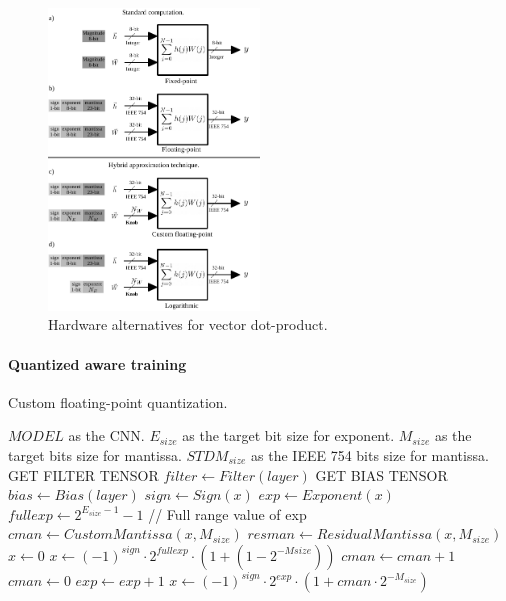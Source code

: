 \begin{figure}[t!]
	\centering
	\includegraphics[width=0.5\textwidth]{../figures/dot-product_unit.pdf}
	\caption{Hardware alternatives for vector dot-product.}
	\label{fig:dot_product}
\end{figure}


\paragraph{\textbf{Quantized aware training}}


\begin{algorithm}[h!]
	\label{alg:quantize_training}
	\caption{Custom floating-point quantization.}
	\begin{algorithmic}
		\SetAlgoLined
		\renewcommand{\algorithmicrequire}{\textbf{input:}}
		\renewcommand{\algorithmicensure}{\textbf{output:}}
		\REQUIRE $MODEL$ as the CNN.
		\REQUIRE $E_{size}$ as the target bit size for exponent.
		\REQUIRE $M_{size}$ as the target bits size for mantissa.
		\REQUIRE $STDM_{size}$ as the IEEE 754 bits size for mantissa.
		\STATE GET FILTER TENSOR $filter \gets Filter(layer)$
		\STATE GET BIAS TENSOR $bias \gets Bias(layer)$
			\STATE $sign \gets Sign(x)$
			\STATE $exp \gets Exponent(x)$
			\STATE $fullexp \gets 2^{E_{size}-1}-1$ // Full range value of exp
			\STATE $cman \gets CustomMantissa(x, M_{size})$
			\STATE $resman \gets ResidualMantissa(x, M_{size})$
				\STATE$x\gets0$
				\STATE$x\gets (-1)^{sign}\cdot2^{fullexp}\cdot(1+(1-2^{-M{size}}))$
			\ELSE
					\STATE $cman \gets cman+1$
					\STATE $cman \gets 0$
					\STATE $exp \gets exp + 1$
					\ENDIF
				\ENDIF
				\STATE$x\gets (-1)^{sign}\cdot2^{exp}\cdot(1+cman\cdot2^{-M_{size}})$
			\ENDIF
		\ENDFOR		
		\ENDIF
		\ENDFOR
	\end{algorithmic}
\end{algorithm}

